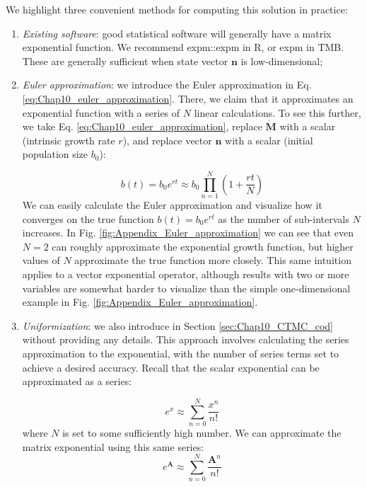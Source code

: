 We highlight three convenient methods for computing this solution in practice:
\begin{enumerate}
    \item \textit{Existing software}:  good statistical software will generally have a matrix exponential function.  We recommend \colorbox{backcolour}{expm::expm} in R, or \colorbox{backblue}{expm} in TMB.  These are generally sufficient when state vector \(\mathbf{n}\) is low-dimensional;

    \item \textit{Euler approximation}:  we introduce the Euler approximation in Eq. \ref{eq:Chap10_euler_approximation}.  There, we claim that it approximates an exponential function with a series of \(N\) linear calculations.  To see this further, we take Eq. \ref{eq:Chap10_euler_approximation}, replace \(\dot{\mathbf{M}}\) with a scalar (intrinsic growth rate \(r\)), and replace vector \(\mathbf{n}\) with a scalar (initial population size \(b_0\)):

    \begin{equation} \label{eq:Appendix_Euler_approximation}
      b(t) = b_0 e^{rt} \approx b_0 \prod_{n=1}^N \left(1+\frac{rt}{N}\right)
    \end{equation}
    We can easily calculate the Euler approximation and visualize how it converges on the true function \(b(t) = b_0 e^{rt}\) as the number of sub-intervals \(N\) increases.  In Fig. \ref{fig:Appendix_Euler_approximation} we can see that even \(N=2\) can roughly approximate the exponential growth function, but higher values of \(N\) approximate the true function more closely.  This same intuition applies to a vector exponential operator, although results with two or more variables are somewhat harder to visualize than the simple one-dimensional example in Fig. \ref{fig:Appendix_Euler_approximation}.

    \item \textit{Uniformization}:  we also introduce  in Section \ref{sec:Chap10_CTMC_cod} without providing any details.  This approach involves calculating the series approximation to the exponential, with the number of series terms set to achieve a desired accuracy.  Recall that the scalar exponential can be approximated as a series:

    \begin{equation} \label{eq:Appendix_series_approximation}
      e^x \approx \sum_{n=0}^N \frac{x^n}{n!}
    \end{equation}
    where \(N\) is set to some sufficiently high number.  We can approximate the matrix exponential using this same series:
    \begin{equation} 
      e^\mathbf{A} \approx \sum_{n=0}^N \frac{\mathbf{A}^n}{n!}
    \end{equation}
    

\end{enumerate}
